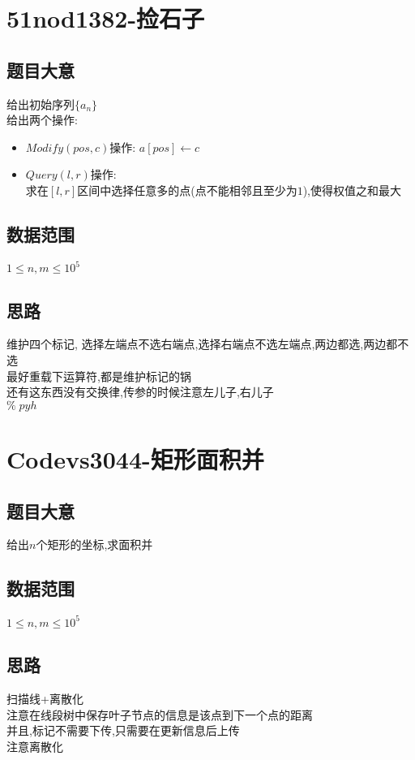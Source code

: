 \documentclass{ctexart}
\numberwithin{equation}{section}
\begin{document}
\begin{flushleft}
  \section{51nod1382-捡石子}
  \subsection{题目大意}
  给出初始序列$\{a_n\}$\\
  给出两个操作:\\
  \begin{itemize}
  \item $Modify(pos,c)$操作: $a[pos] \leftarrow c$
  \item $Query(l,r)$操作:\\
    求在$[l,r]$区间中选择任意多的点(点不能相邻且至少为$1$),使得权值之和最大
  \end{itemize}
  \subsection{数据范围}
  $1\le n,m\le 10^5$\\
  \subsection{思路}
  维护四个标记, 选择左端点不选右端点,选择右端点不选左端点,两边都选,两边都不选\\
  最好重载下运算符,都是维护标记的锅\\
  还有这东西没有交换律,传参的时候注意左儿子,右儿子\\
  $\%\; pyh $\\
  \newpage

  \section{Codevs3044-矩形面积并}
  \subsection{题目大意}
  给出$n$个矩形的坐标,求面积并\\
  \subsection{数据范围}
  $1\le n,m\le 10^5$\\
  \subsection{思路}
  扫描线+离散化\\
  注意在线段树中保存叶子节点的信息是该点到下一个点的距离\\
  并且,标记不需要下传,只需要在更新信息后上传\\
  注意离散化\\
  \newpage


\end{flushleft}
\end{document}
